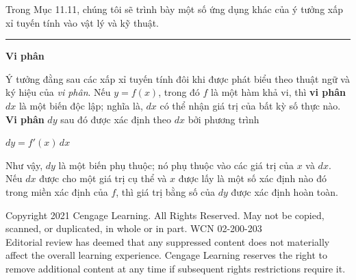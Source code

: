 \begin{minipage}[t]{0.70\textwidth}
  Trong Mục 11.11, chúng tôi sẽ trình bày một số ứng dụng khác của ý tưởng xấp xỉ tuyến tính vào vật lý và kỹ thuật.

  \vspace{1.2em}
  \noindent
  {\color{stewartblue}\rule{1.3ex}{1.3ex}}\;\textsf{\textbf{Vi phân}}

  \vspace{0.4em}
  \noindent
  Ý tưởng đằng sau các xấp xỉ tuyến tính đôi khi được phát biểu theo thuật ngữ và ký hiệu của \textit{vi phân}. Nếu $y = f(x)$, trong đó $f$ là một hàm khả vi, thì \textbf{vi phân} $dx$ là một biến độc lập; nghĩa là, $dx$ có thể nhận giá trị của bất kỳ số thực nào. \textbf{Vi phân} $dy$ sau đó được xác định theo $dx$ bởi phương trình
  
  \vspace{0.3em}
  \noindent
  \begin{minipage}{\linewidth}
    \hfill
    $\displaystyle dy = f'(x)\,dx$
    \hfill\null
  \end{minipage}
  \vspace{0.3em}

  \noindent
  Như vậy, $dy$ là một biến phụ thuộc; nó phụ thuộc vào các giá trị của $x$ và $dx$. Nếu $dx$ được cho một giá trị cụ thể và $x$ được lấy là một số xác định nào đó trong miền xác định của $f$, thì giá trị bằng số của $dy$ được xác định hoàn toàn.
\end{minipage}

\vfill
\begin{center}
  {\fontsize{6.5pt}{8pt}\selectfont\color{black!70}
  Copyright 2021 Cengage Learning. All Rights Reserved. May not be copied, scanned, or duplicated, in whole or in part. WCN 02-200-203\\
  Editorial review has deemed that any suppressed content does not materially affect the overall learning experience. Cengage Learning reserves the right to remove additional content at any time if subsequent rights restrictions require it.
  }
\end{center}
